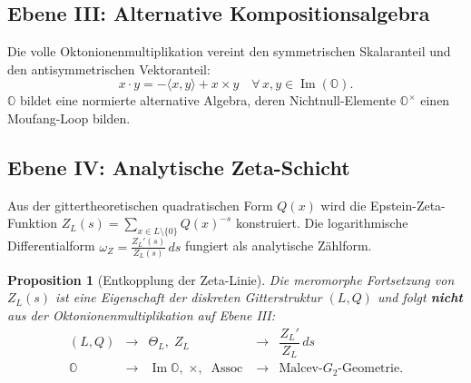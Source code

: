 \documentclass[11pt,a4paper]{article}
\newtheorem{proposition}[theorem]{Proposition}
\theoremstyle{definition}
\newcommand{\Oalg}{\mathbb{O}}
\newcommand{\ImO}{\operatorname{Im}(\mathbb{O})}
\begin{document}
	\subsection{Ebene III: Alternative Kompositionsalgebra}
	Die volle Oktonionenmultiplikation vereint den symmetrischen Skalaranteil und den antisymmetrischen Vektoranteil:
	\begin{equation}
		x \cdot y = -\langle x, y \rangle + x \times y \quad \forall\, x,y \in \ImO.
	\end{equation}
	$\Oalg$ bildet eine normierte alternative Algebra, deren Nichtnull-Elemente $\Oalg^\times$ einen Moufang-Loop bilden.
	\subsection{Ebene IV: Analytische Zeta-Schicht}
	Aus der gittertheoretischen quadratischen Form $Q(x)$ wird die Epstein-Zeta-Funktion $Z_L(s) = \sum_{x \in L \setminus \{0\}} Q(x)^{-s}$ konstruiert. Die logarithmische Differentialform $\omega_Z = \frac{Z_L'(s)}{Z_L(s)} \, ds$ fungiert als analytische Zählform.
	\begin{proposition}[Entkopplung der Zeta-Linie]
		Die meromorphe Fortsetzung von $Z_L(s)$ ist eine Eigenschaft der diskreten Gitterstruktur $(L, Q)$ und folgt \textbf{nicht} aus der Oktonionenmultiplikation auf Ebene III:
		\begin{equation}
			\begin{array}{ccccc}
				(L, Q) &\longrightarrow& \Theta_L, \; Z_L &\longrightarrow& \dfrac{Z_L'}{Z_L} \, ds \\[2mm]
				\mathbb{O} &\longrightarrow& \operatorname{Im}\mathbb{O}, \; \times, \; \operatorname{Assoc} &\longrightarrow& \text{Malcev-$G_2$-Geometrie}.
			\end{array}
		\end{equation}
	\end{proposition}
\end{document}

